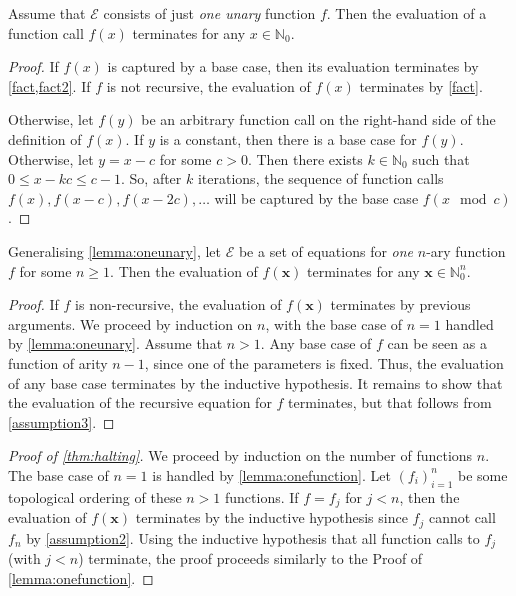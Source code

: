 \documentclass[a4paper,UKenglish,cleveref, autoref, thm-restate]{lipics-v2021}
\begin{document}
\begin{lemma}\label{lemma:oneunary}
  Assume that $\mathcal{E}$ consists of just \emph{one unary} function $f$. Then
  the evaluation of a function call $f(x)$ terminates for any
  $x \in \mathbb{N}_{0}$.
\end{lemma}
\begin{proof}
  If $f(x)$ is captured by a base case, then its evaluation terminates by
  \cref{fact,fact2}. If $f$ is not recursive, the evaluation of
  $f(x)$ terminates by \cref{fact}.

  Otherwise, let $f(y)$ be an arbitrary function call on the right-hand side of
  the definition of $f(x)$. If $y$ is a constant, then there is a base case for
  $f(y)$. Otherwise, let $y = x - c$ for some $c > 0$. Then there exists
  $k \in \mathbb{N}_{0}$ such that $0 \le x - kc \le c-1$. So, after $k$
  iterations, the sequence of function calls $f(x), f(x-c), f(x-2c),\dots$ will
  be captured by the base case $f(x \mod c)$.
\end{proof}

\begin{lemma}\label{lemma:onefunction}
  Generalising \cref{lemma:oneunary}, let $\mathcal{E}$ be a set of equations
  for \emph{one} $n$-ary function $f$ for some $n \ge 1$. Then the evaluation of
  $f(\mathbf{x})$ terminates for any $\mathbf{x} \in \mathbb{N}_{0}^{n}$.
\end{lemma}
\begin{proof}
  If $f$ is non-recursive, the evaluation of $f(\mathbf{x})$ terminates by
  previous arguments. We proceed by induction on $n$, with the base case of
  $n=1$ handled by \cref{lemma:oneunary}. Assume that $n > 1$. Any base case of
  $f$ can be seen as a function of arity $n-1$, since one of the parameters is
  fixed. Thus, the evaluation of any base case terminates by the inductive
  hypothesis. It remains to show that the evaluation of the recursive equation
  for $f$ terminates, but that follows from \cref{assumption3}.
\end{proof}

\begin{proof}[Proof of \cref{thm:halting}]
  We proceed by induction on the number of functions $n$. The base case of $n=1$
  is handled by \cref{lemma:onefunction}. Let ${(f_{i})}_{i=1}^{n}$ be some
  topological ordering of these $n > 1$ functions. If $f = f_{j}$ for $j < n$,
  then the evaluation of $f(\mathbf{x})$ terminates by the inductive hypothesis
  since $f_{j}$ cannot call $f_{n}$ by \cref{assumption2}. Using the inductive
  hypothesis that all function calls to $f_{j}$ (with $j < n$) terminate, the
  proof proceeds similarly to the Proof of \cref{lemma:onefunction}.
\end{proof}
\end{document}
